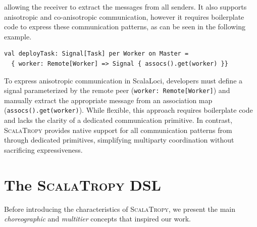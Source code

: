 \documentclass[runningheads]{llncs}
\newcommand{\ourLang}{\textsc{ScalaTropy}}
\newcommand{\code}[1]{\lstinline[style=scala3,basicstyle=\ttfamily\small\color{vscLightText}]{#1}}
\begin{document}
allowing the receiver to extract the messages from all senders.
%
It also supports anisotropic and co-anisotropic communication,
however it requires boilerplate code to express these communication patterns,
as can be seen in the following example.
\begin{lstlisting}[style=scala3]
val deployTask: Signal[Task] per Worker on Master =
  { worker: Remote[Worker] => Signal { assocs().get(worker) }}
\end{lstlisting}
%
To express anisotropic communication in ScalaLoci,
developers must define a signal parameterized by the remote peer (\code{worker: Remote[Worker]})
and manually extract the appropriate message from an association map (\code{assocs().get(worker)}).
%
While flexible, this approach requires boilerplate code
and lacks the clarity of a dedicated communication primitive.
%
In contrast,
\ourLang{} provides native support for all communication patterns from 
through dedicated primitives,
simplifying multiparty coordination without sacrificing expressiveness.

\section{The \ourLang{} DSL}\label{sec:language}
Before introducing the characteristics of \ourLang{},
we present the main \emph{choreographic} and \emph{multitier} concepts that inspired our work.
\end{document}
